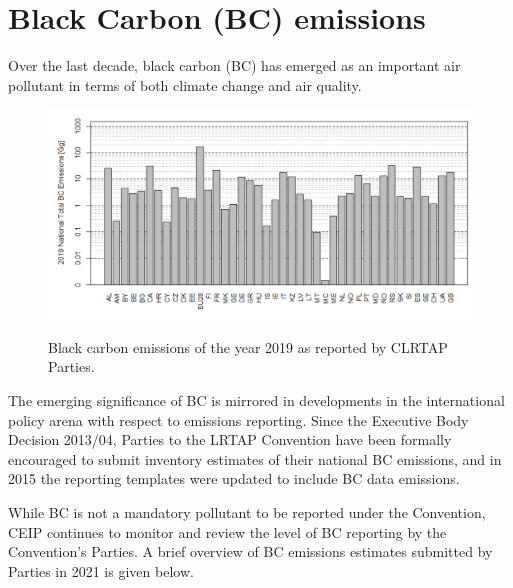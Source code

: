\section{Black Carbon (BC) emissions}  
\label{sec:bc}

Over the last decade, black carbon (BC) has emerged as an important air pollutant in terms of both climate change and air quality.  

\begin{figure}[h]
\centering
{\includegraphics*[viewport=1 1 950 465,clip,scale=0.4]{FIGS_CEIP/Fig2.pdf}}
\caption{Black carbon emissions of the year 2019 as reported by CLRTAP Parties.}
\label{fig:CEIP2}
\end{figure}


The emerging significance of BC is mirrored in developments in the international policy arena with respect to emissions reporting.
Since the Executive Body Decision 2013/04, Parties to the LRTAP Convention have been formally encouraged to
submit inventory estimates of their national BC emissions, and in 2015 the reporting templates were updated to include
BC data emissions.



While BC is not a mandatory pollutant to be reported under the Convention, CEIP continues to monitor and review the level of BC reporting by the Convention's Parties. A brief overview of BC emissions estimates submitted by Parties in 2021 is given below.  %

